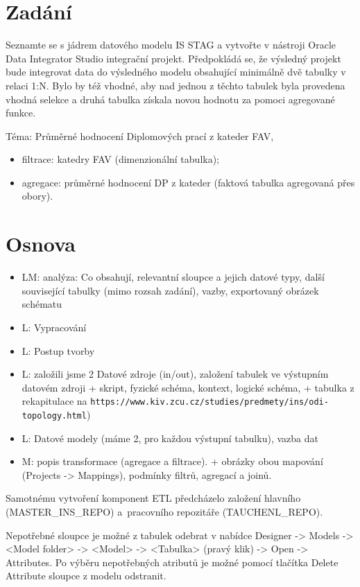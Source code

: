 \section{Zadání}

Seznamte se s jádrem datového modelu IS STAG a vytvořte v nástroji Oracle Data Integrator Studio integrační projekt.
Předpokládá se, že výsledný projekt bude integrovat data do výsledného modelu obsahující minimálně dvě tabulky v relaci 1:N.
Bylo by též vhodné, aby nad jednou z těchto tabulek byla provedena vhodná selekce a druhá tabulka získala novou hodnotu za pomoci agregované funkce.

Téma: Průměrné hodnocení Diplomových prací z kateder FAV,

\begin{itemize}
    \item filtrace: katedry FAV (dimenzionální tabulka);
    \item agregace: průměrné hodnocení DP z kateder (faktová tabulka agregovaná přes obory).
\end{itemize}

\section{Osnova}

\begin{itemize}
    \item LM: analýza: Co obsahují, relevantní sloupce a jejich datové typy, další související tabulky (mimo rozsah zadání), vazby, exportovaný obrázek schématu
    \item L: Vypracování
    \item L: Postup tvorby
    \item L: založili jsme 2 Datové zdroje (in/out), založení tabulek ve výstupním datovém zdroji + skript, fyzické schéma, kontext, logické schéma, + tabulka z rekapitulace na \nolinkurl{https://www.kiv.zcu.cz/studies/predmety/ins/odi-topology.html})
    \item L: Datové modely (máme 2, pro každou výstupní tabulku), vazba dat
    \item M: popis transformace (agregace a filtrace). + obrázky obou mapování (Projects -> Mappings), podmínky filtrů, agregací a joinů.
\end{itemize}

Samotnému vytvoření komponent ETL předcházelo založení hlavního (MASTER\_INS\_REPO) a~pracovního repozitáře (TAUCHENL\_REPO).

Nepotřebné sloupce je možné z tabulek odebrat v nabídce Designer -> Models -> <Model folder> -> <Model> -> <Tabulka> (pravý klik) -> Open -> Attributes.
Po výběru nepotřebných atributů je možné pomocí tlačítka Delete Attribute sloupce z modelu odstranit.

